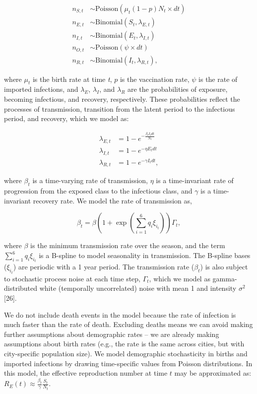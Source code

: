\documentclass[3p]{elsarticle} %
\begin{document}
\begin{align}
n_{S,t} &\sim \text{Poisson}(\mu_t (1 - p) N_t \times dt) \\
n_{E,t} &\sim \text{Binomial}( S_{t}, \lambda_{E,t}) \\
n_{I,t} &\sim \text{Binomial}( E_{t}, \lambda_{I,t}) \\
n_{O,t} &\sim \text{Poisson}(\psi \times dt) \\
n_{R,t} &\sim \text{Binomial}( I_{t}, \lambda_{R,t}),
\end{align}

\noindent{}where \(\mu_t\) is the birth rate at time \emph{t}, \(p\) is
the vaccination rate, \(\psi\) is the rate of imported infections, and
\(\lambda_E\), \(\lambda_I\), and \(\lambda_R\) are the probabilities of
exposure, becoming infectious, and recovery, respectively. These
probabilities reflect the processes of transmission, transition from the
latent period to the infectious period, and recovery, which we model as:

\begin{align}
\lambda_{E,t} &= 1 - e^{-\frac{\beta_t I_t dt}{N_t}} \\
\lambda_{I,t} &= 1 - e^{-\eta E_{t} dt} \\
\lambda_{R,t} &= 1 - e^{-\gamma I_{t} dt},
\end{align}

\noindent{}where \(\beta_t\) is a time-varying rate of transmission,
\(\eta\) is a time-invariant rate of progression from the exposed class
to the infectious class, and \(\gamma\) is a time-invariant recovery
rate. We model the rate of transmission as,

\begin{equation}
\beta_t = \beta \left(1 + \exp \left( \sum^6_{i=1} q_i \xi_{i_{t}} \right) \right) \Gamma_t,
\end{equation}

\ignorespaces

\noindent{} where \(\beta\) is the minimum transmission rate over the
season, and the term \(\sum^6_{i=1} q_i \xi_{i_{t}}\) is a B-spline to
model seasonality in transmission. The B-spline bases (\(\xi_{i_{t}}\))
are periodic with a 1 year period. The transmission rate (\(\beta_t\))
is also subject to stochastic process noise at each time step,
\(\Gamma_t\), which we model as gamma-distributed white (temporally
uncorrelated) noise with mean 1 and intensity \(\sigma^2\) {[}26{]}.

We do not include death events in the model because the rate of
infection is much faster than the rate of death. Excluding deaths means
we can avoid making further assumptions about demographic rates -- we
are already making assumptions about birth rates (e.g., the rate is the
same across cities, but with city-specific population size). We model
demographic stochasticity in births and imported infections by drawing
time-specific values from Poisson distributions. In this model, the
effective reproduction number at time \(t\) may be approximated as:
\(R_E(t) \approx \frac{\beta_t}{\gamma} \frac{S_t}{N_t}\).
\end{document}
